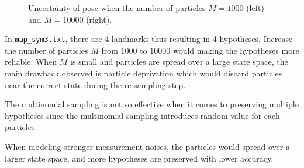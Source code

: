 \documentclass[11pt,a4paper]{article}
\begin{document}
\begin{figure}
	\centering
	\scalebox{0.5}{}
	\scalebox{0.5}{}
	\caption{Uncertainty of pose when the number of particles $M=1000$ (left) and $M=10000$ (right).}
	\label{fig:Tracking_Uncertainty_Map_2_M_1000_10000}
\end{figure}

\par In \texttt{map\_sym3.txt}, there are 4 landmarks thus resulting in 4 hypotheses. Increase the number of particles $M$ from $1000$ to $10000$ would making the hypotheses more reliable. When $M$ is small and particles are spread over a large state space, the main drawback observed is particle deprivation which would discard particles near the correct state during the re-sampling step.
\par The multinomial sampling is not so effective when it comes to preserving multiple hypotheses since the multinomial sampling introduces random value for each particles.
\par When modeling stronger measurement noises, the particles would spread over a larger state space, and more hypotheses are preserved with lower accuracy.

\break
\end{document}
